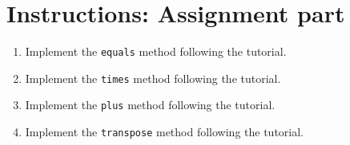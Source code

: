 \section{Instructions: Assignment part}\label{instructions-assignment-part}

\begin{enumerate}
\def\labelenumi{\arabic{enumi}.}
\item
  Implement the \texttt{equals} method following the tutorial.
\item
  Implement the \texttt{times} method following the tutorial.
\item
  Implement the \texttt{plus} method following the tutorial.
\item
  Implement the \texttt{transpose} method following the tutorial.
\end{enumerate}
